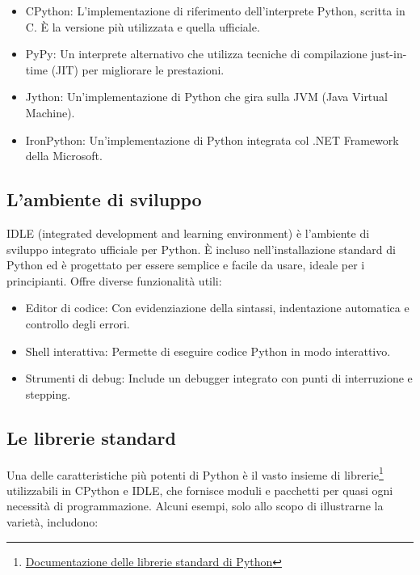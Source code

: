 \documentclass[
  letterpaper,
]{scrbook}
\providecommand{\tightlist}{%
  \setlength{\itemsep}{0pt}\setlength{\parskip}{0pt}}\usepackage{longtable,booktabs,array}
\begin{document}
\begin{itemize}
\tightlist
\item
  CPython: L'implementazione di riferimento dell'interprete Python,
  scritta in C. È la versione più utilizzata e quella ufficiale.
\item
  PyPy: Un interprete alternativo che utilizza tecniche di compilazione
  just-in-time (JIT) per migliorare le prestazioni.
\item
  Jython: Un'implementazione di Python che gira sulla JVM (Java Virtual
  Machine).
\item
  IronPython: Un'implementazione di Python integrata col .NET Framework
  della Microsoft.
\end{itemize}

\subsection{L'ambiente di sviluppo}\label{lambiente-di-sviluppo}

IDLE (integrated development and learning environment) è l'ambiente di
sviluppo integrato ufficiale per Python. È incluso nell'installazione
standard di Python ed è progettato per essere semplice e facile da
usare, ideale per i principianti. Offre diverse funzionalità utili:

\begin{itemize}
\tightlist
\item
  Editor di codice: Con evidenziazione della sintassi, indentazione
  automatica e controllo degli errori.
\item
  Shell interattiva: Permette di eseguire codice Python in modo
  interattivo.
\item
  Strumenti di debug: Include un debugger integrato con punti di
  interruzione e stepping.
\end{itemize}

\subsection{Le librerie standard}\label{le-librerie-standard}

Una delle caratteristiche più potenti di Python è il vasto insieme di
librerie\footnote{\href{https://docs.python.org/3/library/index.html}{Documentazione
  delle librerie standard di Python}} utilizzabili in CPython e IDLE,
che fornisce moduli e pacchetti per quasi ogni necessità di
programmazione. Alcuni esempi, solo allo scopo di illustrarne la
varietà, includono:
\end{document}
